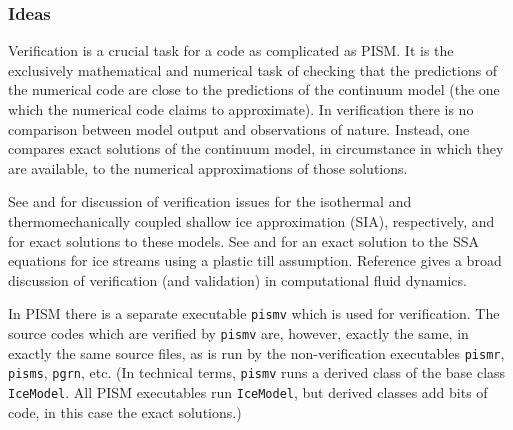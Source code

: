 \documentclass[11pt,final]{amsart}
\begin{document}
\subsubsection*{Ideas}  Verification is a crucial task for a code as complicated as PISM.  It is the exclusively mathematical and numerical task of checking that the predictions of the numerical code are close to the predictions of the continuum model (the one which the numerical code claims to approximate).  In verification there is no comparison between model output and observations of nature.  Instead, one compares exact solutions of the continuum model, in circumstance in which they are available, to the numerical approximations of those solutions.

See \cite{BLKCB} and \cite{BBL} for discussion of verification issues for the isothermal and thermomechanically coupled shallow ice approximation (SIA), respectively, and for exact solutions to these models.  See \cite{SchoofStream} and \cite{BBssasliding} for an exact solution to the SSA equations for ice streams using a plastic till assumption.  Reference \cite{Roache} gives a broad discussion of verification (and validation) in computational fluid dynamics.

In PISM there is a separate executable \verb|pismv| which is used for verification.  The source codes which are verified by \verb|pismv| are, however, exactly the same, in exactly the same source files, as is run by the non-verification executables \verb|pismr|, \verb|pisms|, \verb|pgrn|, etc.  (In technical terms, \verb|pismv| runs a derived class of the base class \verb|IceModel|.  All PISM executables run \verb|IceModel|, but derived classes add bits of code, in this case the exact solutions.)
\end{document}
